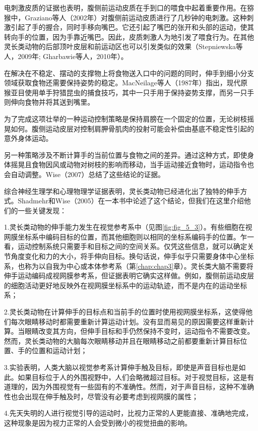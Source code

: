 电刺激皮质的证据也表明，腹侧前运动皮质在手到口的喂食中起着重要作用。在猕猴中，Graziano等人（2002年）对腹侧前运动皮质进行了几秒钟的电刺激。这种刺激引起了手的握合，同时手移向嘴巴。它还引起了嘴巴的张开和头部的运动，使其转向手的位置，因为手靠近嘴巴。因此，皮质刺激人为地引发了喂食行为。在其他灵长类动物的后部顶叶皮层和前运动区也可以引发类似的效果（Stepniewska等人，2009年; Gharbawie等人，2010年）。

在解决在不稳定、摆动的支撑物上将食物送入口中的问题的同时，伸手到细小分支领域获取食物还需要保持姿势的稳定。MacNeilage等人（1987年）指出，现代原猴亚目使用单手狩猎昆虫的捕食技巧，其中一只手用于保持姿势支撑，而另一只手则伸向食物并将其送到嘴里。

为了完成这项壮举的一种运动控制策略是保持肩膀在一个固定的位置，无论树枝摇晃如何。腹侧运动皮层对控制肩胛骨肌肉的投射可能会补偿由基底不稳定性引起的意外身体运动。

另一种策略涉及不断计算手的当前位置与食物之间的差异。通过这种方式，即使身体摇晃且食物因风或动物对树枝的影响而移动，当手运动接近食物时，运动指令也会自动调整。Wise（2007）总结了这些结论的证据。

综合神经生理学和心理物理学证据表明，灵长类动物已经进化出了独特的伸手方式。Shadmehr和Wise（2005）在一本书中论述了这个结论，但我们在这里介绍他们的一些关键发现：\par
1.灵长类动物的伸手能力发生在视觉参考系中（见图\ref{fig:fig_5_3}）。有些细胞在视网膜坐标系中编码目标的位置，而其他细胞则以相同的坐标系编码手的位置。乍一看，运动控制系统只需要手和目标之间的空间关系。仅凭这些信息，就可以确定关节角度变化和力的大小，将手伸向目标。换句话说，伸手似乎只需要身体中心坐标系，也称为以自我为中心或本体参考系（第\ref{chap:chap3}章）。灵长类大脑不需要将伸手运动编码成视网膜参考系，但证据表明它确实这样做。例如，腹侧前运动皮层的细胞活动更好地反映外在视网膜坐标系中的运动轨迹，而不是内在的运动坐标系；\par
2.灵长类动物在计算伸手的目标点和当前手的位置时使用视网膜坐标系，这使得他们每次眼睛移动时都需要重新计算运动计划。没有显而易见的原因需要这样重新计算。当眼睛改变其方向，但伸手目标和手仍然保持不变时，运动指令不需要改变。然而，灵长类动物的大脑每次眼睛移动并且在眼睛移动之前都要重新计算目标位置、手的位置和运动计划；\par
3.实验表明，人类大脑以视觉参考系计算伸手触及目标，即使是声音目标也是如此。如果目标位于人的外围视野中，人们会略微超过目标。对于视觉目标，这是有道理的，因为外围视觉有一些固有的不准确性。然而，对于声音目标，这种不准确性也会出现在伸手触及时，尽管没有必要考虑到视网膜的属性；\par
4.先天失明的人进行视觉引导的运动时，比视力正常的人更能直接、准确地完成，这种现象是因为视力正常的人会受到微小的视觉扭曲的影响。

